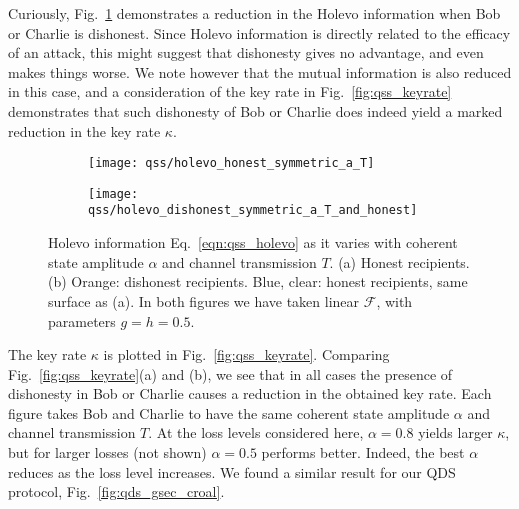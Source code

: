 Curiously, Fig.~\ref{fig:qss_holevo_information} demonstrates a reduction in the Holevo information when Bob or Charlie is dishonest. Since Holevo information is directly related to the efficacy of an attack, this might suggest that dishonesty gives no advantage, and even makes things worse. We note however that the mutual information is also reduced in this case, and a consideration of the key rate in Fig.~\ref{fig:qss_keyrate} demonstrates that such dishonesty of Bob or Charlie does indeed yield a marked reduction in the key rate $\kappa$. %

\begin{figure}[htp]
\captionsetup{width=\linewidth}
\centering
	\begin{subfigure}{0.49\linewidth}
	\centering
	\texttt{[image: qss/holevo\_honest\_symmetric\_a\_T]}
	\caption{}	
	\end{subfigure}
	\begin{subfigure}{0.49\linewidth}
	\centering
	\texttt{[image: qss/holevo\_dishonest\_symmetric\_a\_T\_and\_honest]}
	\caption{}	
	\end{subfigure}
\caption{\label{fig:qss_holevo_information} Holevo information Eq.~\ref{eqn:qss_holevo} as it varies with coherent state amplitude $\alpha$ and channel transmission $T$. (a) Honest recipients. (b) Orange: dishonest recipients. Blue, clear: honest recipients, same surface as (a). In both figures we have taken linear $\mathcal{F}$, with parameters $g = h = 0.5$.}
\end{figure}

The key rate $\kappa$ is plotted in Fig.~\ref{fig:qss_keyrate}. Comparing Fig.~\ref{fig:qss_keyrate}(a) and (b), we see that in all cases the presence of dishonesty in Bob or Charlie causes a reduction in the obtained key rate. Each figure takes Bob and Charlie to have the same coherent state amplitude $\alpha$ and channel transmission $T$. At the loss levels considered here, $\alpha=0.8$ yields larger $\kappa$, but for larger losses (not shown) $\alpha=0.5$ performs better. Indeed, the best $\alpha$ reduces as the loss level increases. We found a similar result for our QDS protocol, Fig.~\ref{fig:qds_gsec_croal}.


